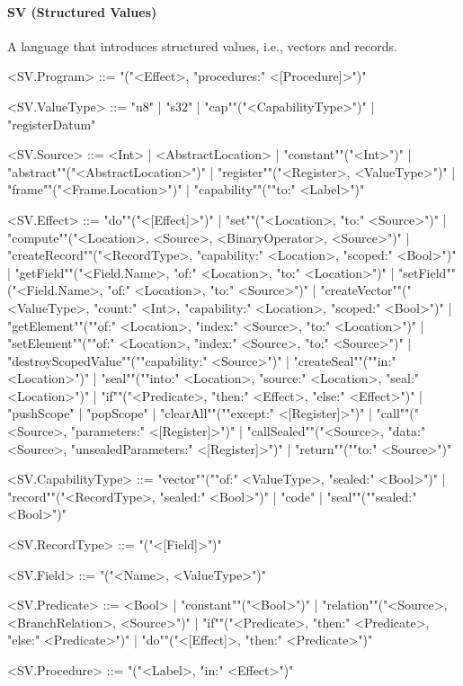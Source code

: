 \documentclass[main.tex]{subfiles}
\begin{document}
\paragraph{ SV (Structured Values) } A language that introduces structured values, i.e., vectors and records.
\begin{grammar}
	\footnotesize
				<SV.Program> ::=
							"("<Effect>, "procedures:" <[Procedure]>")"
				\par
				<SV.ValueType> ::=
						"u8"
						| "s32"
						| "cap""("<CapabilityType>")"
						| "registerDatum"
				\par
				<SV.Source> ::=
						<Int> |
								<AbstractLocation> |
						"constant""("<Int>")"
						| "abstract""("<AbstractLocation>")"
						| "register""("<Register>, <ValueType>")"
						| "frame""("<Frame.Location>")"
						| "capability""(""to:" <Label>")"
				\par
				<SV.Effect> ::=
						"do""("<[Effect]>")"
						| "set""("<Location>, "to:" <Source>")"
						| "compute""("<Location>, <Source>, <BinaryOperator>, <Source>")"
						| "createRecord""("<RecordType>, "capability:" <Location>, "scoped:" <Bool>")"
						| "getField""("<Field.Name>, "of:" <Location>, "to:" <Location>")"
						| "setField""("<Field.Name>, "of:" <Location>, "to:" <Source>")"
						| "createVector""("<ValueType>, "count:" <Int>, "capability:" <Location>, "scoped:" <Bool>")"
						| "getElement""(""of:" <Location>, "index:" <Source>, "to:" <Location>")"
						| "setElement""(""of:" <Location>, "index:" <Source>, "to:" <Source>")"
						| "destroyScopedValue""(""capability:" <Source>")"
						| "createSeal""(""in:" <Location>")"
						| "seal""(""into:" <Location>, "source:" <Location>, "seal:" <Location>")"
						| "if""("<Predicate>, "then:" <Effect>, "else:" <Effect>")"
						| "pushScope"
						| "popScope"
						| "clearAll""(""except:" <[Register]>")"
						| "call""("<Source>, "parameters:" <[Register]>")"
						| "callSealed""("<Source>, "data:" <Source>, "unsealedParameters:" <[Register]>")"
						| "return""(""to:" <Source>")"
				\par
				<SV.CapabilityType> ::=
						"vector""(""of:" <ValueType>, "sealed:" <Bool>")"
						| "record""("<RecordType>, "sealed:" <Bool>")"
						| "code"
						| "seal""(""sealed:" <Bool>")"
				\par
				<SV.RecordType> ::=
							"("<[Field]>")"
				\par
				<SV.Field> ::=
							"("<Name>, <ValueType>")"
				\par
				<SV.Predicate> ::=
						<Bool> |
						"constant""("<Bool>")"
						| "relation""("<Source>, <BranchRelation>, <Source>")"
						| "if""("<Predicate>, "then:" <Predicate>, "else:" <Predicate>")"
						| "do""("<[Effect]>, "then:" <Predicate>")"
				\par
				<SV.Procedure> ::=
							"("<Label>, "in:" <Effect>")"
				\par
\end{grammar}
\par
\end{document}
